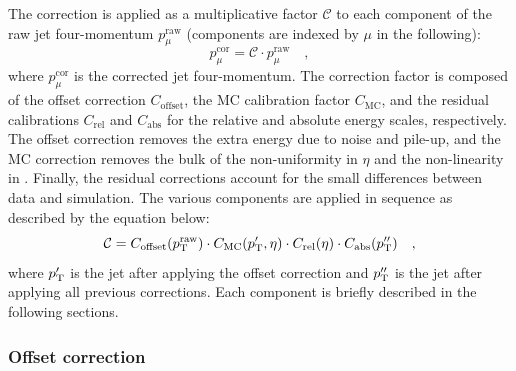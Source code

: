 The correction is applied as a multiplicative factor $\mathcal{C}$ to each component of the raw jet four-momentum $p_\mu^\mathrm{raw}$ (components are indexed by $\mu$ in the following):
\begin{equation}
p_\mu^\mathrm{cor} = \mathcal{C}\cdot p_\mu^\mathrm{raw} \quad,
\end{equation}
where $p_\mu^\mathrm{cor}$ is the corrected jet four-momentum. The correction factor is composed of the offset correction $C_\mathrm{offset}$, the MC calibration factor $C_\mathrm{MC}$, and the residual calibrations $C_\mathrm{rel}$ and $C_\mathrm{abs}$ for the relative and absolute energy scales, respectively. The offset correction removes the extra energy due to noise and pile-up, and the MC correction removes the bulk of the non-uniformity in $\eta$ and the non-linearity in \pt. Finally, the residual corrections account for the small differences between data and simulation. The various components are applied in sequence as described by the equation below:
\begin{equation}
\mathcal{C} = C_\mathrm{offset}(p_\mathrm{T}^\mathrm{raw}) \cdot C_\mathrm{MC}(p_\mathrm{T}',\eta) \cdot C_\mathrm{rel}(\eta) \cdot C_\mathrm{abs}(p_\mathrm{T}'') \quad ,
\end{equation}
where $p_\mathrm{T}'$ is the jet \pt after applying the offset correction and $p_\mathrm{T}''$ is the jet \pt after applying all previous corrections. Each component is briefly described in the following sections.

\subsubsection{Offset correction}
 
